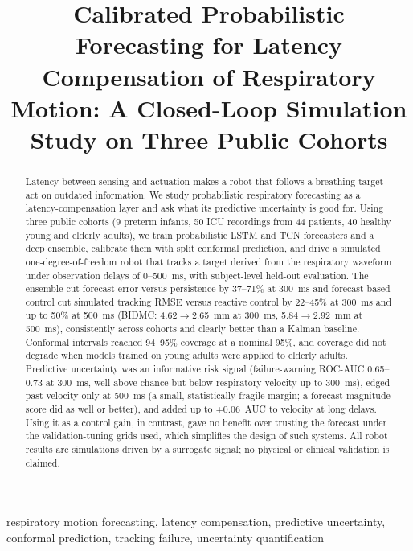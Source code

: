 \documentclass[conference]{IEEEtran}
\begin{document}
\title{Calibrated Probabilistic Forecasting for Latency Compensation of Respiratory Motion: A Closed-Loop Simulation Study on Three Public Cohorts}

\author{
}

\maketitle

\begin{abstract}
Latency between sensing and actuation makes a robot that follows a breathing target act on outdated information. We study probabilistic respiratory forecasting as a latency-compensation layer and ask what its predictive uncertainty is good for. Using three public cohorts (9 preterm infants, 50 ICU recordings from 44 patients, 40 healthy young and elderly adults), we train probabilistic LSTM and TCN forecasters and a deep ensemble, calibrate them with split conformal prediction, and drive a simulated one-degree-of-freedom robot that tracks a target derived from the respiratory waveform under observation delays of 0--500~ms, with subject-level held-out evaluation. The ensemble cut forecast error versus persistence by 37--71\% at 300~ms and forecast-based control cut simulated tracking RMSE versus reactive control by 22--45\% at 300~ms and up to 50\% at 500~ms (BIDMC: 4.62$\to$2.65~mm at 300~ms, 5.84$\to$2.92~mm at 500~ms), consistently across cohorts and clearly better than a Kalman baseline. Conformal intervals reached 94--95\% coverage at a nominal 95\%, and coverage did not degrade when models trained on young adults were applied to elderly adults. Predictive uncertainty was an informative risk signal (failure-warning ROC-AUC 0.65--0.73 at 300~ms, well above chance but below respiratory velocity up to 300~ms), edged past velocity only at 500~ms (a small, statistically fragile margin; a forecast-magnitude score did as well or better), and added up to +0.06~AUC to velocity at long delays. Using it as a control gain, in contrast, gave no benefit over trusting the forecast under the validation-tuning grids used, which simplifies the design of such systems. All robot results are simulations driven by a surrogate signal; no physical or clinical validation is claimed.
\end{abstract}

\begin{IEEEkeywords}
respiratory motion forecasting, latency compensation, predictive uncertainty, conformal prediction, tracking failure, uncertainty quantification
\end{IEEEkeywords}
\end{document}
